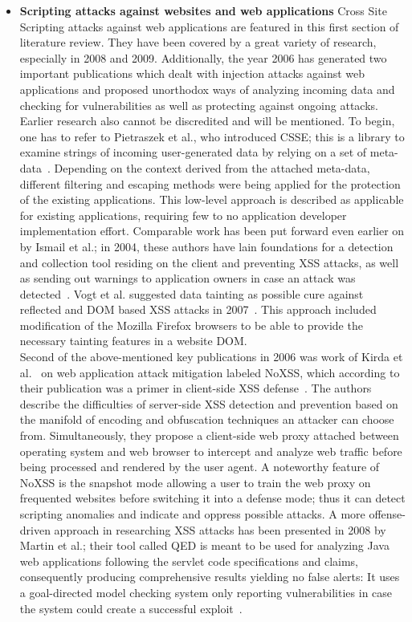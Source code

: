   \begin{itemize}
    \item \textbf{Scripting attacks against websites and web applications} 
      Cross Site Scripting attacks against web applications are featured in this first section of literature review. They have been covered by a great variety of research, especially in 2008 and 2009. Additionally, the year 2006 has generated two important publications which dealt with injection attacks against web applications and proposed unorthodox ways of analyzing incoming data and checking for vulnerabilities as well as protecting against ongoing attacks. Earlier research also cannot be discredited and will be mentioned. To begin, one has to refer to Pietraszek et al., who introduced CSSE; this is a library to examine strings of incoming user-generated data by relying on a set of meta-data~\cite{pietraszek2006defending}. Depending on the context derived from the attached meta-data, different filtering and escaping methods were being applied for the protection of the existing applications. This low-level approach is described as applicable for existing applications, requiring few to no application developer implementation effort. Comparable work has been put forward even earlier on by Ismail et al.; in 2004, these authors have lain foundations for a detection and collection tool residing on the client and preventing XSS attacks, as well as sending out warnings to application owners in case an attack was detected~\cite{ismail2004proposal}. Vogt et al. suggested data tainting as possible cure against reflected and DOM based XSS attacks in 2007~\cite{vogt2007cross}. This approach included modification of the Mozilla Firefox browsers to be able to provide the necessary tainting features in a website DOM. \\

      Second of the above-mentioned key publications in 2006  was work of Kirda et al.~\cite{kirda2006noxes} on web application attack mitigation labeled NoXSS, which according to their publication was a primer in client-side XSS defense~\cite{kirda2006noxes}. The authors describe the difficulties of server-side XSS detection and prevention based on the manifold of encoding and obfuscation techniques an attacker can choose from. Simultaneously, they propose a client-side web proxy attached between operating system and web browser to intercept and analyze web traffic before being processed and rendered by the user agent. A noteworthy feature of NoXSS is the snapshot mode allowing a user to train the web proxy on frequented websites before switching it into a defense mode; thus it can detect scripting anomalies and indicate and oppress possible attacks. A more offense-driven approach in researching XSS attacks has been presented in 2008 by Martin et al.; their tool called QED is meant to be used for analyzing Java web applications following the servlet code specifications and claims, consequently producing comprehensive results yielding no false alerts: It uses a goal-directed model checking system only reporting vulnerabilities in case the system could create a successful exploit~\cite{martin2008automatic}. \\


\end{itemize}

